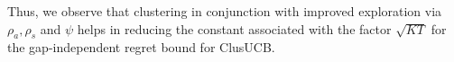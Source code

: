 Thus, we observe that clustering in conjunction with improved exploration via $\rho_{a},\rho_{s}$ and $\psi$ helps in reducing the constant associated with the factor $\sqrt{KT}$ for the gap-independent regret bound for ClusUCB.
